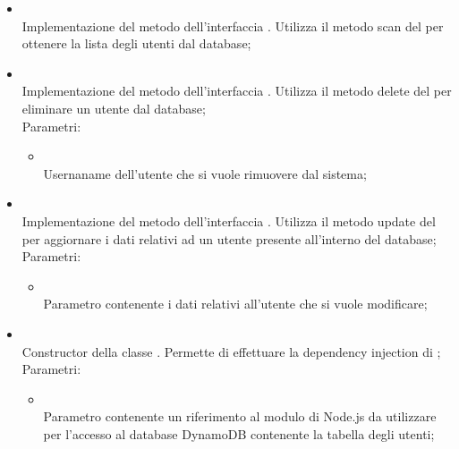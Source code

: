 \begin{itemize}
\begin{itemize}
\begin{itemize}
		\end{itemize}
		\item[]  \\
		Implementazione del metodo dell'interfaccia . Utilizza il metodo scan del  per ottenere la lista degli utenti dal database;\\
		\item[]  \\
		Implementazione del metodo dell'interfaccia . Utilizza il metodo delete del  per eliminare un utente dal database;\\
		Parametri:
		\begin{itemize}
			\item {} \\
			Usernaname dell'utente che si vuole rimuovere dal sistema;
		\end{itemize}
		\item[]  \\
		Implementazione del metodo dell'interfaccia . Utilizza il metodo update del  per aggiornare i dati relativi ad un utente presente all'interno del database;\\
		Parametri:
		\begin{itemize}
			\item {} \\
			Parametro contenente i dati relativi all'utente che si vuole modificare;
		\end{itemize}
		\item[]  \\
		Constructor della classe . Permette di effettuare la dependency injection di ;\\
		Parametri:
		\begin{itemize}
			\item {} \\
			Parametro contenente un riferimento al modulo di Node.js da utilizzare per l'accesso al database DynamoDB contenente la tabella degli utenti;
		\end{itemize}
	\end{itemize}
\end{itemize}
\FloatBarrier


